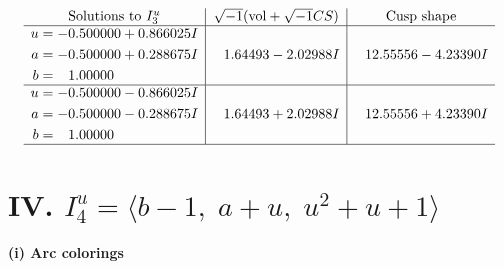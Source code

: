 \documentclass[1p]{elsarticle_modified}
\theoremstyle{definition}
\newcommand{\I}{\sqrt{-1}}
\begin{document}
$$\begin{array}{c|c|c}  
\text{Solutions to }I^u_{3}& \I (\text{vol} + \sqrt{-1}CS) & \text{Cusp shape}\\
 \hline 
\begin{aligned}
u &= -0.500000 + 0.866025 I \\
a &= -0.500000 + 0.288675 I \\
b &= \phantom{-}1.00000\phantom{ +0.000000I}\end{aligned}
 & \phantom{-}1.64493 - 2.02988 I & \phantom{-}12.55556 - 4.23390 I \\ \hline\begin{aligned}
u &= -0.500000 - 0.866025 I \\
a &= -0.500000 - 0.288675 I \\
b &= \phantom{-}1.00000\phantom{ +0.000000I}\end{aligned}
 & \phantom{-}1.64493 + 2.02988 I & \phantom{-}12.55556 + 4.23390 I\\
 \hline 
 \end{array}$$\newpage\newpage\renewcommand{\arraystretch}{1}
\centering \section*{IV. $I^u_{4}= \langle b-1,\;a+u,\;u^2+u+1 \rangle$}
\flushleft \textbf{(i) Arc colorings}\\
\end{document}
